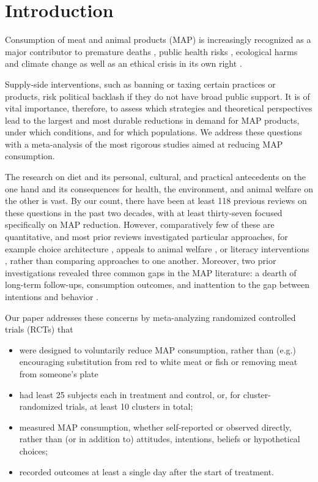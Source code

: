 \documentclass[sn-nature,pdflatex]{sn-jnl}
\begin{document}
\maketitle

\section{Introduction}\label{sec1}

Consumption of meat and animal products (MAP) is increasingly recognized
as a major contributor to premature deaths
\citep{willett2019, landry2023}, public health risks
\citep{slingenbergh2004, graham2008}, ecological harms
\citep{greger2010} and climate change
\citep{scarborough2023, koneswaran2008} as well as an ethical crisis in
its own right \citep{kuruc2023, singer2023}.

Supply-side interventions, such as banning or taxing certain practices
or products, risk political backlash if they do not have broad public
support. It is of vital importance, therefore, to assess which
strategies and theoretical perspectives lead to the largest and most
durable reductions in demand for MAP products, under which conditions,
and for which populations. We address these questions with a
meta-analysis of the most rigorous studies aimed at reducing MAP
consumption.

The research on diet and its personal, cultural, and practical
antecedents on the one hand and its consequences for health, the
environment, and animal welfare on the other is vast. By our count,
there have been at least 118 previous reviews on these questions in the
past two decades, with at least thirty-seven focused specifically on MAP
reduction. However, comparatively few of these are quantitative, and
most prior reviews investigated particular approaches, for example
choice architecture \citep{bianchi2018restructuring}, appeals to animal
welfare \citep{mathur2021effectiveness}, or literacy interventions
\citep{DiGennaro2024}, rather than comparing approaches to one another.
Moreover, two prior investigations revealed three common gaps in the MAP
literature: a dearth of long-term follow-ups, consumption outcomes, and
inattention to the gap between intentions and behavior
\citep{mathur2021meta, mathur2021effectiveness}.

Our paper addresses these concerns by meta-analyzing randomized
controlled trials (RCTs) that

\begin{itemize}
\item
  were designed to voluntarily reduce MAP consumption, rather than
  (e.g.) encouraging substitution from red to white meat or fish or
  removing meat from someone's plate
\item
  had least 25 subjects each in treatment and control, or, for
  cluster-randomized trials, at least 10 clusters in total;
\item
  measured MAP consumption, whether self-reported or observed directly,
  rather than (or in addition to) attitudes, intentions, beliefs or
  hypothetical choices;
\item
  recorded outcomes at least a single day after the start of treatment.
\end{itemize}
\end{document}
